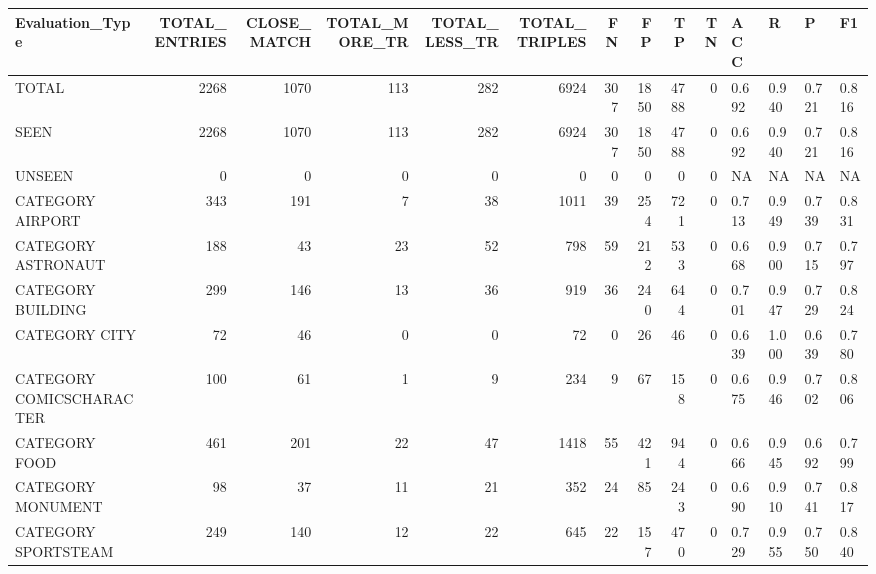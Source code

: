 \begin{tabular}{lrrrrrrrrrllll}
\hline
 Evaluation\_Type          &   TOTAL\_ENTRIES &   CLOSE\_MATCH &   TOTAL\_MORE\_TR &   TOTAL\_LESS\_TR &   TOTAL\_TRIPLES &   FN &   FP &   TP &   TN & ACC   & R     & P     & F1    \\
\hline
 TOTAL                    &            2268 &          1070 &             113 &             282 &            6924 &  307 & 1850 & 4788 &    0 & 0.692 & 0.940 & 0.721 & 0.816 \\
 SEEN                     &            2268 &          1070 &             113 &             282 &            6924 &  307 & 1850 & 4788 &    0 & 0.692 & 0.940 & 0.721 & 0.816 \\
 UNSEEN                   &               0 &             0 &               0 &               0 &               0 &    0 &    0 &    0 &    0 & NA    & NA    & NA    & NA    \\
 CATEGORY AIRPORT         &             343 &           191 &               7 &              38 &            1011 &   39 &  254 &  721 &    0 & 0.713 & 0.949 & 0.739 & 0.831 \\
 CATEGORY ASTRONAUT       &             188 &            43 &              23 &              52 &             798 &   59 &  212 &  533 &    0 & 0.668 & 0.900 & 0.715 & 0.797 \\
 CATEGORY BUILDING        &             299 &           146 &              13 &              36 &             919 &   36 &  240 &  644 &    0 & 0.701 & 0.947 & 0.729 & 0.824 \\
 CATEGORY CITY            &              72 &            46 &               0 &               0 &              72 &    0 &   26 &   46 &    0 & 0.639 & 1.000 & 0.639 & 0.780 \\
 CATEGORY COMICSCHARACTER &             100 &            61 &               1 &               9 &             234 &    9 &   67 &  158 &    0 & 0.675 & 0.946 & 0.702 & 0.806 \\
 CATEGORY FOOD            &             461 &           201 &              22 &              47 &            1418 &   55 &  421 &  944 &    0 & 0.666 & 0.945 & 0.692 & 0.799 \\
 CATEGORY MONUMENT        &              98 &            37 &              11 &              21 &             352 &   24 &   85 &  243 &    0 & 0.690 & 0.910 & 0.741 & 0.817 \\
 CATEGORY SPORTSTEAM      &             249 &           140 &              12 &              22 &             645 &   22 &  157 &  470 &    0 & 0.729 & 0.955 & 0.750 & 0.840 \\

\end{tabular}
